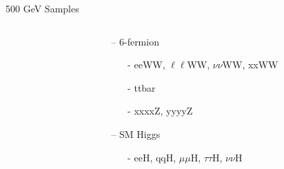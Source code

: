 \documentclass[10pt]{beamer}
\begin{document}
\begin{frame}{500 GeV Samples}
\begin{columns}
\begin{column}{0.5\textwidth}
\end{column}
\begin{column}{0.5\textwidth}
\begin{itemize}
	\item[--] 6-fermion
	\begin{itemize}
		\scriptsize
		\item[-]eeWW, $\ell\ell$WW, $\nu\nu$WW, xxWW
		\item[-]ttbar
		\item[-]xxxxZ, yyyyZ
	\end{itemize}
	\item[--] SM Higgs
		\begin{itemize}
			\scriptsize
			\item[-] eeH, qqH, $\mu\mu$H, $\tau\tau$H, $\nu\nu$H
		\end{itemize}\quad\quad
\end{itemize}
\end{column}
\end{columns}


\end{frame}
\end{document}
